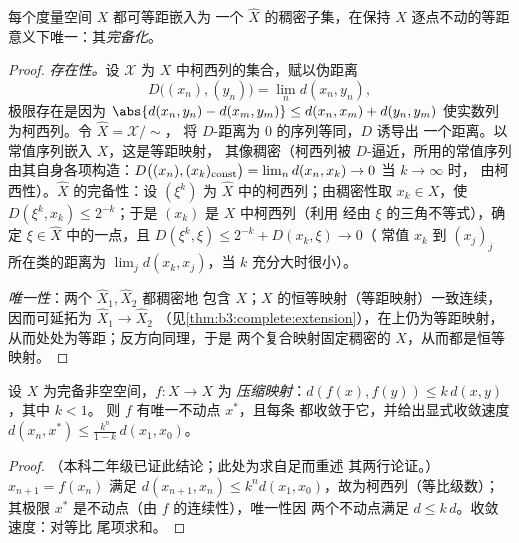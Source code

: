 \begin{theorem}[完备化]\label{thm:b3:complete:completion}
每个度量空间 $X$ 都可等距嵌入为
一个 $\hat X$ 的稠密子集，在保持
$X$ 逐点不动的等距意义下唯一：其\emph{完备化}。
\end{theorem}

\begin{proof}
\emph{存在性。}设 $\mathcal X$ 为
$X$ 中柯西列的集合，赋以伪距离
\[
D\bigl((x_n), (y_n)\bigr) = \lim_n d(x_n, y_n),
\]
极限存在是因为 $\abs{d(x_n, y_n) - d(x_m, y_m)}
\leq d(x_n, x_m) + d(y_n, y_m)$ 使实数列
为柯西列。令 $\hat X = \mathcal X/{\sim}$，
将 $D$-距离为 $0$ 的序列等同，$D$ 诱导出
一个距离。以常值序列嵌入 $X$，这是等距映射，
其像稠密（柯西列被 $D$-逼近，所用的常值序列
由其自身各项构造：$D\bigl((x_n), (x_k)_{\rm
const}\bigr) = \lim_n d(x_n, x_k) \to 0$ 当 $k \to \infty$ 时，
由柯西性）。$\hat X$ 的完备性：设 $(\xi^k)$ 为
$\hat X$ 中的柯西列；由稠密性取 $x_k \in X$，使 $D(\xi^k, x_k)
\leq 2^{-k}$；于是 $(x_k)$ 是 $X$ 中柯西列（利用
经由 $\xi$ 的三角不等式），确定 $\xi \in \hat
X$ 中的一点，且 $D(\xi^k, \xi) \leq 2^{-k} + D(x_k, \xi) \to 0$（
常值 $x_k$ 到 $(x_j)_j$ 所在类的距离为
$\lim_j d(x_k, x_j)$，当 $k$ 充分大时很小）。

\emph{唯一性}：两个 $\hat X_1, \hat X_2$ 都稠密地
包含 $X$；$X$ 的恒等映射（等距映射）一致连续，
因而可延拓为 $\hat X_1 \to \hat X_2$
（见\cref{thm:b3:complete:extension}），在上仍为等距映射，
从而处处为等距；反方向同理，于是
两个复合映射固定稠密的 $X$，从而都是恒等映射。
\end{proof}

\begin{theorem}[巴拿赫不动点定理]\label{thm:b3:complete:banach}
设 $X$ 为完备非空空间，$f \colon X \to X$ 为
\emph{压缩映射}：$d(f(x), f(y)) \leq k\,d(x,y)$，其中 $k < 1$。
则 $f$ 有唯一不动点 $x^*$，且每条
都收敛于它，并给出显式收敛速度 $d(x_n, x^*) \leq
\frac{k^n}{1-k}\,d(x_1, x_0)$。
\end{theorem}

\begin{proof}
（本科二年级已证此结论；此处为求自足而重述
其两行论证。） $x_{n+1} = f(x_n)$ 满足 $d(x_{n+1},
x_n) \leq k^nd(x_1, x_0)$，故为柯西列（等比级数）；
其极限 $x^*$ 是不动点（由 $f$ 的连续性），唯一性因
两个不动点满足 $d \leq k\,d$。收敛速度：对等比
尾项求和。
\end{proof}

